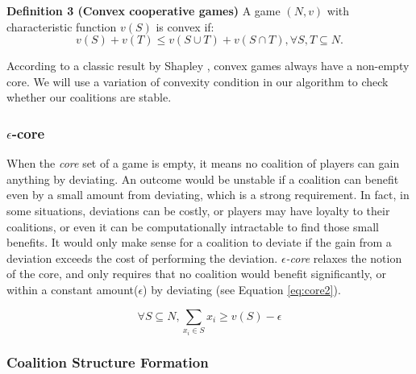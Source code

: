             {\bf Definition 3 (Convex cooperative games)} A game $(N,v)$ with
            characteristic function $v(S)$ is convex if:
            \begin{equation}\label{eq:convex}
            v(S) + v(T) \leq v(S \cup T) + v (S \cap T), \forall S,T \subseteq
            N.
            \end{equation}

            According to a classic result by Shapley \cite{S1971cores}, convex
            games always have a non-empty core. We will use a variation of
            convexity condition in our algorithm to check whether our
            coalitions are stable.

            \subsubsection*{$\epsilon$-core}\label{s:epsilon}
            When the \emph{core} set of a game is empty, it means no coalition
            of players can gain anything by deviating. An outcome would be
            unstable if a coalition can benefit even by a small amount from
            deviating, which is a strong requirement. In fact, in some
            situations, deviations can be costly, or players may have loyalty
            to their coalitions, or even it can be computationally intractable
            to find those small benefits. It would only make sense for a
            coalition to deviate if the gain from a deviation exceeds the cost
            of performing the deviation. \emph{$\epsilon$-core} relaxes the
            notion of the core, and only requires that no coalition would
            benefit significantly, or within a constant amount($\epsilon$) by
            deviating (see Equation \ref{eq:core2}).

            \begin{equation}\label{eq:core2}
            \forall S \subseteq N, \sum_{x_i \in S} x_i \geq v(S) - \epsilon
            \end{equation}

            \subsubsection*{Coalition Structure Formation}\label{sec:coalition}

